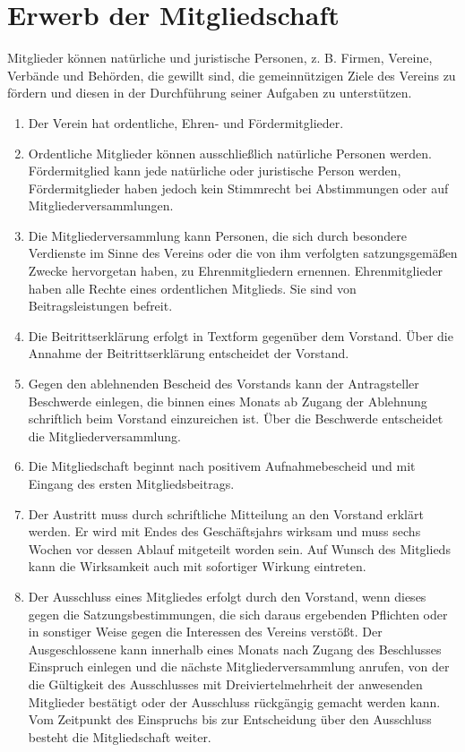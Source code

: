 \documentclass[12pt,a4paper,titlepage]{scrartcl}
\begin{document}
\section{Erwerb der Mitgliedschaft}
Mitglieder können natürliche und juristische Personen, z. B. Firmen, Vereine, Verbände und Behörden, die gewillt sind, die gemeinnützigen Ziele des Vereins zu fördern und diesen in der Durchführung seiner Aufgaben zu unterstützen.
\begin{enumerate}
\item Der Verein hat ordentliche, Ehren- und Fördermitglieder.
\item Ordentliche Mitglieder können ausschließlich natürliche Personen werden. Fördermitglied kann jede natürliche oder juristische Person werden, Fördermitglieder haben jedoch kein Stimmrecht bei Abstimmungen oder auf Mitgliederversammlungen.
\item Die Mitgliederversammlung kann Personen, die sich durch besondere Verdienste im Sinne des Vereins oder die von ihm verfolgten satzungsgemäßen Zwecke hervorgetan haben, zu Ehrenmitgliedern ernennen. Ehrenmitglieder haben alle Rechte eines ordentlichen Mitglieds. Sie sind von Beitragsleistungen befreit.
\item Die Beitrittserklärung erfolgt in Textform gegenüber dem Vorstand. Über die Annahme der Beitrittserklärung entscheidet der Vorstand.
\item  Gegen den ablehnenden Bescheid des Vorstands kann der Antragsteller Beschwerde einlegen, die binnen eines Monats ab Zugang der Ablehnung schriftlich beim Vorstand einzureichen ist. Über die Beschwerde entscheidet die Mitgliederversammlung.
\item Die Mitgliedschaft beginnt nach positivem Aufnahmebescheid und mit Eingang des ersten Mitgliedsbeitrags.
\item Der Austritt muss durch schriftliche Mitteilung an den Vorstand erklärt werden. 
Er wird mit Endes des Geschäftsjahrs wirksam und muss sechs Wochen vor 
dessen Ablauf mitgeteilt worden sein. Auf Wunsch des Mitglieds kann die 
Wirksamkeit auch mit sofortiger Wirkung eintreten. 
\item Der Ausschluss eines Mitgliedes erfolgt durch den Vorstand, wenn dieses gegen die Satzungsbestimmungen, die sich daraus ergebenden Pflichten oder in sonstiger Weise gegen die Interessen des Vereins verstößt. Der Ausgeschlossene kann 
innerhalb eines Monats nach Zugang des Beschlusses Einspruch einlegen und 
die nächste Mitgliederversammlung anrufen, von der die Gültigkeit des 
Ausschlusses mit Dreiviertelmehrheit der anwesenden Mitglieder bestätigt oder 
der Ausschluss rückgängig gemacht werden kann. Vom Zeitpunkt des 
Einspruchs bis zur Entscheidung über den Ausschluss besteht die Mitgliedschaft 
weiter. 
\end{enumerate}
\end{document}

